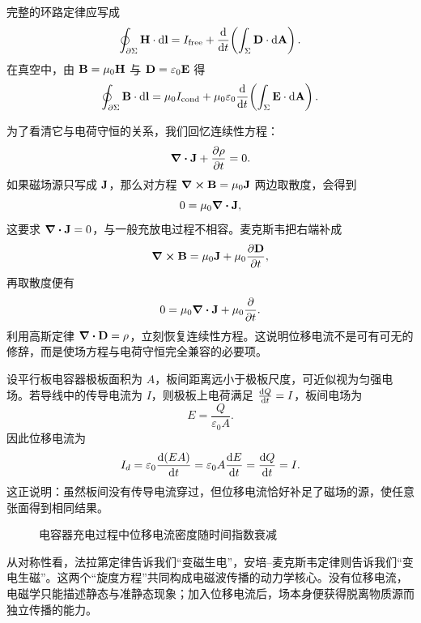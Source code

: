 \begin{law}[安培--麦克斯韦定律的积分形式]
完整的环路定律应写成
\[
\oint_{\partial \Sigma} \vb{H}\cdot \dd \vb{l}
= I_{\text{free}}+\dv{}{t}\!\left(\int_{\Sigma}\vb{D}\cdot \dd\vb{A}\right).
\]
在真空中，由 $\vb{B}=\mu_0\vb{H}$ 与 $\vb{D}=\varepsilon_0\vb{E}$ 得
\[
\oint_{\partial \Sigma} \vb{B}\cdot \dd \vb{l}
=\mu_0 I_{\text{cond}}+\mu_0\varepsilon_0\dv{}{t}\!\left(\int_{\Sigma}\vb{E}\cdot \dd\vb{A}\right).
\]
\end{law}

为了看清它与电荷守恒的关系，我们回忆连续性方程：
\[
\div \vb{J}+\pdv{\rho}{t}=0.
\]
如果磁场源只写成 $\vb{J}$，那么对方程 $\curl \vb{B}=\mu_0\vb{J}$ 两边取散度，会得到
\[
0=\mu_0\div \vb{J},
\]
这要求 $\div \vb{J}=0$，与一般充放电过程不相容。麦克斯韦把右端补成
\[
\curl \vb{B}=\mu_0\vb{J}+\mu_0\pdv{\vb{D}}{t},
\]
再取散度便有
\[
0=\mu_0\div\vb{J}+\mu_0\pdv{}{t}(\div\vb{D}).
\]
利用高斯定律 $\div\vb{D}=\rho$，立刻恢复连续性方程。这说明位移电流不是可有可无的修辞，而是使场方程与电荷守恒完全兼容的必要项。

\begin{example}[充电电容器中的位移电流]
设平行板电容器极板面积为 $A$，板间距离远小于极板尺度，可近似视为匀强电场。若导线中的传导电流为 $I$，则极板上电荷满足 $\dv{Q}{t}=I$，板间电场为
\[
E=\frac{Q}{\varepsilon_0 A}.
\]
因此位移电流为
\[
I_d=\varepsilon_0\dv{(EA)}{t}=\varepsilon_0 A \dv{E}{t}
=\dv{Q}{t}=I.
\]
这正说明：虽然板间没有传导电流穿过，但位移电流恰好补足了磁场的源，使任意张面得到相同结果。
\end{example}

\begin{figure}[htbp]
\centering
{}
\caption{电容器充电过程中位移电流密度随时间指数衰减}
\end{figure}

\begin{remark}
从对称性看，法拉第定律告诉我们“变磁生电”，安培--麦克斯韦定律则告诉我们“变电生磁”。这两个“旋度方程”共同构成电磁波传播的动力学核心。没有位移电流，电磁学只能描述静态与准静态现象；加入位移电流后，场本身便获得脱离物质源而独立传播的能力。
\end{remark}

